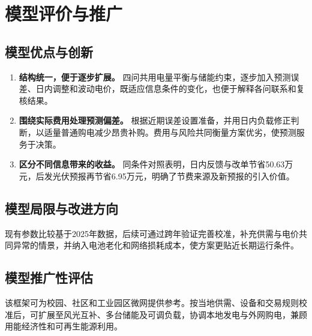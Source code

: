 \section{模型评价与推广}

\subsection{模型优点与创新}

\begin{enumerate}
    \item \textbf{结构统一，便于逐步扩展。}
    四问共用电量平衡与储能约束，逐步加入预测误差、日内调整和波动电价，既适应信息条件的变化，也便于解释各问联系和复核结果。

    \item \textbf{围绕实际费用处理预测偏差。}
    根据近期误差设置准备，并用日内负载修正判断，以适量普通购电减少昂贵补购。费用与风险共同衡量方案优劣，使预测服务于决策。

    \item \textbf{区分不同信息带来的收益。}
    同条件对照表明，日内反馈与改单节省50.63万元，后发光伏预报再节省6.95万元，明确了节费来源及新预报的引入价值。
\end{enumerate}

\subsection{模型局限与改进方向}

现有参数比较基于2025年数据，后续可通过跨年验证完善校准，补充供需与电价共同异常的情景，并纳入电池老化和网络损耗成本，使方案更贴近长期运行条件。

\subsection{模型推广性评估}

该框架可为校园、社区和工业园区微网提供参考。按当地供需、设备和交易规则校准后，可扩展至风光互补、多台储能及可调负载，协调本地发电与外网购电，兼顾用能经济性和可再生能源利用。
